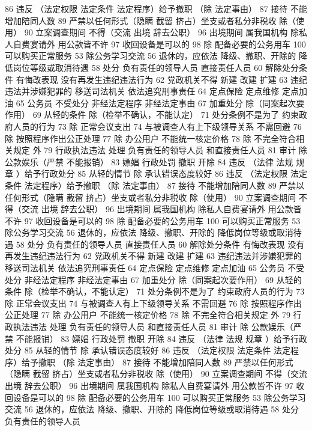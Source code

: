 \documentclass[11pt]{ctexart}
\begin{document}
86 违反 （法定权限 法定条件 法定程序）给予撤职
（除 法定事由）
87 接待 不能增加陪同人数
89 严禁以任何形式（隐瞒 截留 挤占）坐支或者私分非税收
除（使用）
90 立案调查期间 不得（交流 出境 辞去公职）
96 出境期间 属我国机构 除私人自费宴请外 用公款皆不许
97 收回设备是可以的
98 除 配备必要的公务用车
100 可以购买正常服务
53 除公务学习交流
56 退休的，应依法
降级、撤职、开除的 降低岗位等级或取消待遇
58 处分
负有责任的领导人员
直接责任人员
60 解除处分条件
有悔改表现
没有再发生违纪违法行为
62 党政机关不得
新建 改建 扩建
63 违纪违法并涉嫌犯罪的
移送司法机关
依法追究刑事责任
64 定点保险 定点维修 定点加油
65 公务员 不受处分
非经法定程序
非经法定事由
67 加重处分
除（同案起次要作用）
69 从轻的条件
除（检举不确认，不能认定）
71 处分条例不是为了
约束政府人员的行为
73 除 正常会议支出
74 与被调查人有上下级领导关系 不需回避
76 除 按照程序作出公正处理
77 除 办公用户
不能统一核定价格
78 除 不完全符合相关规定 外
79 行政执法违法 处理
负有责任的领导人员
和直接责任人员
81 审计
除 公款娱乐（严禁 不能报销）
83 嫖娼 行政处罚
撤职 开除
84 违反 （法律 法规 规章 ）给予行政处分
85 从轻的情节
除 承认错误态度较好
86 违反 （法定权限 法定条件 法定程序）给予撤职
（除 法定事由）
87 接待 不能增加陪同人数
89 严禁以任何形式（隐瞒 截留 挤占）坐支或者私分非税收
除（使用）
90 立案调查期间 不得（交流 出境 辞去公职）
96 出境期间 属我国机构 除私人自费宴请外 用公款皆不许
97 收回设备是可以的
98 除 配备必要的公务用车
100 可以购买正常服务
53 除公务学习交流
56 退休的，应依法
降级、撤职、开除的 降低岗位等级或取消待遇
58 处分
负有责任的领导人员
直接责任人员
60 解除处分条件
有悔改表现
没有再发生违纪违法行为
62 党政机关不得
新建 改建 扩建
63 违纪违法并涉嫌犯罪的
移送司法机关
依法追究刑事责任
64 定点保险 定点维修 定点加油
65 公务员 不受处分
非经法定程序
非经法定事由
67 加重处分
除（同案起次要作用）
69 从轻的条件
除（检举不确认，不能认定）
71 处分条例不是为了
约束政府人员的行为
73 除 正常会议支出
74 与被调查人有上下级领导关系 不需回避
76 除 按照程序作出公正处理
77 除 办公用户
不能统一核定价格
78 除 不完全符合相关规定 外
79 行政执法违法 处理
负有责任的领导人员
和直接责任人员
81 审计
除 公款娱乐（严禁 不能报销）
83 嫖娼 行政处罚
撤职 开除
84 违反 （法律 法规 规章 ）给予行政处分
85 从轻的情节
除 承认错误态度较好
86 违反 （法定权限 法定条件 法定程序）给予撤职
（除 法定事由）
87 接待 不能增加陪同人数
89 严禁以任何形式（隐瞒 截留 挤占）坐支或者私分非税收
除（使用）
90 立案调查期间 不得（交流 出境 辞去公职）
96 出境期间 属我国机构 除私人自费宴请外 用公款皆不许
97 收回设备是可以的
98 除 配备必要的公务用车
100 可以购买正常服务
53 除公务学习交流
56 退休的，应依法
降级、撤职、开除的 降低岗位等级或取消待遇
58 处分
负有责任的领导人员
\end{document}
